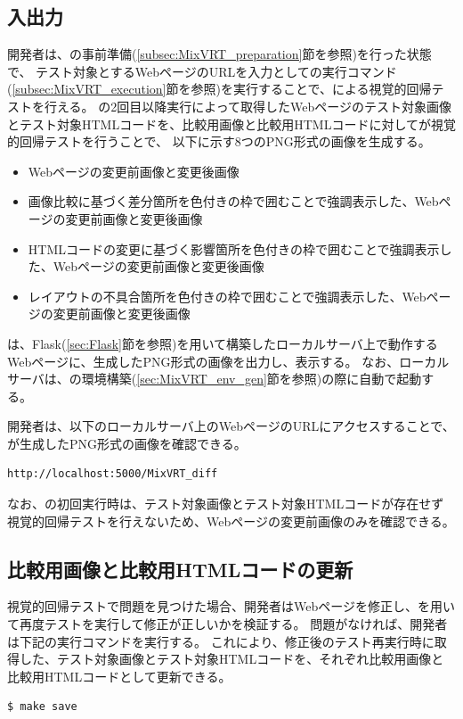 \subsection{入出力}\label{subsec:MixVRT_IO}
開発者は、\toolName の事前準備(\ref{subsec:MixVRT_preparation}節を参照)を行った状態で、
テスト対象とするWebページのURLを入力として\toolName の実行コマンド(\ref{subsec:MixVRT_execution}節を参照)を実行することで、\toolName による視覚的回帰テストを行える。
\toolName の2回目以降実行によって取得したWebページのテスト対象画像とテスト対象HTMLコードを、比較用画像と比較用HTMLコードに対して\toolName が視覚的回帰テストを行うことで、
以下に示す8つのPNG形式の画像を生成する。
\begin{itemize}
    \item Webページの変更前画像と変更後画像
    \item 画像比較に基づく差分箇所を色付きの枠で囲むことで強調表示した、Webページの変更前画像と変更後画像
    \item HTMLコードの変更に基づく影響箇所を色付きの枠で囲むことで強調表示した、Webページの変更前画像と変更後画像
    \item レイアウトの不具合箇所を色付きの枠で囲むことで強調表示した、Webページの変更前画像と変更後画像
\end{itemize}
\toolName は、Flask(\ref{sec:Flask}節を参照)を用いて構築したローカルサーバ上で動作するWebページに、生成したPNG形式の画像を出力し、表示する。
なお、ローカルサーバは、\toolName の環境構築(\ref{sec:MixVRT_env_gen}節を参照)の際に自動で起動する。
\par
開発者は、以下のローカルサーバ上のWebページのURLにアクセスすることで、\toolName が生成したPNG形式の画像を確認できる。
\begin{lstlisting}[label=list:command3,frame=none,numbers=none,basicstyle={\normalsize \ttfamily \color[gray]{.15}}]
    http://localhost:5000/MixVRT_diff
   \end{lstlisting}
なお、\toolName の初回実行時は、テスト対象画像とテスト対象HTMLコードが存在せず視覚的回帰テストを行えないため、Webページの変更前画像のみを確認できる。

\subsection{比較用画像と比較用HTMLコードの更新}\label{subsec:MixVRT_evaluate}
視覚的回帰テストで問題を見つけた場合、開発者はWebページを修正し、\toolName を用いて再度テストを実行して修正が正しいかを検証する。
問題がなければ、開発者は下記の実行コマンドを実行する。
これにより、修正後のテスト再実行時に取得した、テスト対象画像とテスト対象HTMLコードを、それぞれ比較用画像と比較用HTMLコードとして更新できる。
\begin{lstlisting}[label=list:command2,frame=none,numbers=none,basicstyle={\normalsize \ttfamily \color[gray]{.15}}]
    $ make save
\end{lstlisting}

